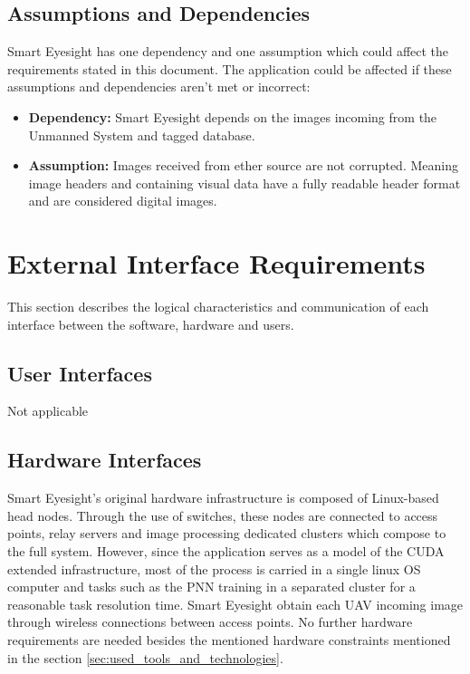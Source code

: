 \documentclass[12pt]{article}
\begin{document}
\subsection{Assumptions and Dependencies}
Smart Eyesight has one dependency and one assumption which could
affect the requirements stated in this document. The application could
be affected if these assumptions and dependencies aren't met or
incorrect:

\begin{itemize}
\item \textbf{Dependency:} Smart Eyesight depends on the images
  incoming from the Unmanned System and tagged database.
\item \textbf{Assumption:} Images received from ether source are not
  corrupted. Meaning image headers and containing visual data have a
  fully readable header format and are considered digital images.
\end{itemize}


\section{External Interface Requirements}
This section describes the logical characteristics and communication
of each interface between the software, hardware and users.

\subsection{User Interfaces}
Not applicable

\subsection{Hardware Interfaces}
Smart Eyesight's original hardware infrastructure is composed of
Linux-based head nodes. Through the use of switches, these nodes are
connected to access points, relay servers and image processing
dedicated clusters which compose to the full system. However, since
the application serves as a model of the CUDA extended infrastructure,
most of the process is carried in a single linux OS computer and tasks
such as the PNN training in a separated cluster for a reasonable task
resolution time. Smart Eyesight obtain each UAV incoming image through
wireless connections between access points. No further hardware
requirements are needed besides the mentioned hardware constraints
mentioned in the section \ref{sec:used_tools_and_technologies}.
\end{document}
